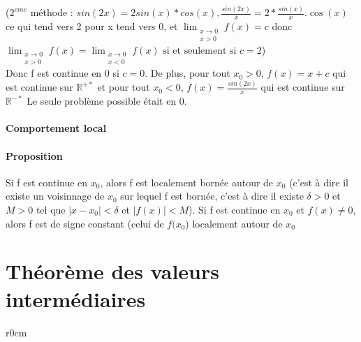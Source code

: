 		($2^{eme}$ méthode : $sin(2x) = 2sin(x)*cos(x), \frac{sin(2x)}{x} = 2*\frac{sin(x)}{x}.\cos(x)$ ce qui tend vers 2 pour x tend vers 0, et $\lim_{\substack{x\to 0 \\  x > 0}} f(x) = c$ donc ~\\
		$\lim_{\substack{x\to 0 \\  x > 0}} f(x) = \lim_{\substack{x\to 0 \\  x<0}} f(x) \text{ si et seulement si } c =2$)
		~\\
		Donc f est continue en 0 si $c=0$. De plus, pour tout $x_0 > 0$, $f(x) = x+c$ qui est continue sur $\mathbb{R}^{+*}$ et pour tout $x_0 < 0$, $f(x) = \frac{sin(2x)}{x}$ qui est continue sur $\mathbb{R}^{-*}$
		Le seule problème possible était en 0.

\paragraph{Comportement local}
\paragraph{Proposition} Si f est continue en $x_0$, alors f est localement bornée autour de $x_0$ (c'est à dire il existe un voisinnage de $x_0$ sur lequel f est bornée, c'est à dire il existe $\delta > 0$ et $M > 0$ tel que $|x-x_0| < \delta$ et $|f(x)| < M$).
Si f est continue en $x_0$ et $f(x) \neq 0$, alors f est de signe constant (celui de $f(x_0$) localement autour de $x_0$

\section{Théorème des valeurs intermédiaires}


\begin{wrapfigure}[9]{r}{0cm}
\end{wrapfigure}
